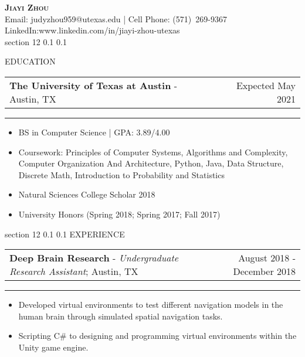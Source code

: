 \documentclass[letter,10.9pt]{article}
\makeatletter
\renewcommand{\section}{\@startsection
  {section}
  {12}
  {\z@}
  {0.1\baselineskip}
  {0.1\baselineskip}
  {\ruled@title}}
\newcommand{\ruled@title}[1]{
  \normalfont\large\scshape\bfseries #1\vskip2pt\hrule\vspace{0pt}}
\newcommand{\restitle}[4]{
  \begin{center}
    {\bfseries\scshape\Large #1}\\
    \vspace{3pt}
    #2\\
    #3\\
    #4
  \end{center}
}
\newcommand{\resentry}[4]{
  \begin{minipage}[t]{\linewidth}
    \setlength\tabcolsep{0pt}
    \begin{tabular*}{\linewidth}{l@{\extracolsep{\fill}}r@{}}
      \textbf{#1} - #2 & #3 \\
    \end{tabular*}
    \rule{3pt}{0pt}
	#4
  \end{minipage}
}
\newenvironment{resitemize}
{\vspace{-10pt}
\begin{itemize}
\setlength{\parskip}{0ex}
\setlength{\leftskip}{-14pt}}
{\end{itemize}}
\makeatother
\begin{document}
\restitle{Jiayi Zhou}
{Email: judyzhou959@utexas.edu | Cell Phone: (571)\ 269-9367 }{LinkedIn:www.linkedin.com/in/jiayi-zhou-utexas}

\section{EDUCATION}
\resentry
{The University of Texas at Austin }
{Austin, TX}
{Expected May 2021}
{
\begin{resitemize}
\item BS in Computer Science | GPA: 3.89/4.00
\item Coursework: Principles of Computer Systems, Algorithms and Complexity, Computer Organization And Architecture, Python, Java, Data Structure, Discrete Math, Introduction to Probability and Statistics
\item Natural Sciences College Scholar 2018
\item University Honors (Spring 2018; Spring 2017; Fall 2017)
\end{resitemize}
 }


\section{EXPERIENCE}

\resentry
{Deep Brain Research}
{\emph{Undergraduate Research Assistant}; Austin, TX}
{August 2018 - December 2018}
{
\begin{resitemize}
\item Developed virtual environments to test different navigation models in the human brain through simulated spatial navigation tasks.
\item  Scripting C\# to designing and programming virtual environments within the Unity game engine. 
\end{resitemize}
 }
 
\end{document}

